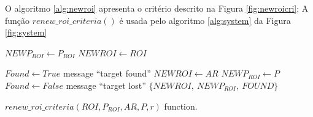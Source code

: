 O algoritmo \ref{alg:newroi} apresenta o critério descrito na Figura \ref{fig:newroicri};
A função $renew\_roi\_criteria()$ é usada pelo algoritmo \ref{alg:system} da Figura \ref{fig:system}
\begin{algorithm}

    $NEWP_{ROI} \leftarrow  P_{ROI}$ \;
    $NEWROI \leftarrow  ROI$ \;
    
    {
      $Found \leftarrow True$\;
        message ``target found''\;
        {
            $NEWROI \leftarrow  AR$\;
            $NEWP_{ROI} \leftarrow  P$\;
        }
    }
    {
      $Found \leftarrow False$\;
      message ``target lost''\;
    }
\Return  $\{NEWROI,~NEWP_{ROI},~FOUND\}$\;
\label{alg:newroi}
\caption{$renew\_roi\_criteria(ROI,P_{ROI},AR,P,r)$ function.}
\end{algorithm}

